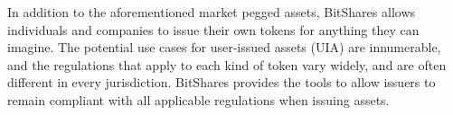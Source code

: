 \label{sec:uia}

In addition to the aforementioned market pegged assets, BitShares allows
individuals and companies to issue their own tokens for anything they can
imagine. The potential use cases for user-issued assets (UIA) are innumerable,
and the regulations that apply to each kind of token vary widely, and are often
different in every jurisdiction. BitShares provides the tools to allow issuers
to remain compliant with all applicable regulations when issuing assets.
